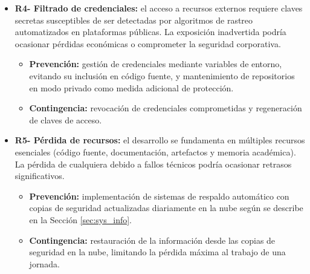 \begin{itemize}
  \item\textbf{R4- Filtrado de credenciales: }el acceso a recursos externos requiere claves secretas susceptibles de ser detectadas por algoritmos de rastreo automatizados en plataformas públicas. La exposición inadvertida podría ocasionar pérdidas económicas o comprometer la seguridad corporativa.
  \begin{itemize}
    \item \textbf{Prevención: }gestión de credenciales mediante variables de entorno, evitando su inclusión en código fuente, y mantenimiento de repositorios en modo privado como medida adicional de protección.
    \item \textbf{Contingencia: }revocación de credenciales comprometidas y regeneración de claves de acceso.
  \end{itemize}
  
  \item\textbf{R5- Pérdida de recursos: }el desarrollo se fundamenta en múltiples recursos esenciales (código fuente, documentación, artefactos y memoria académica). La pérdida de cualquiera debido a fallos técnicos podría ocasionar retrasos significativos.
  \begin{itemize}
    \item \textbf{Prevención: }implementación de sistemas de respaldo automático con copias de seguridad actualizadas diariamente en la nube según se describe en la Sección \ref{sec:sys_info}.
\item \textbf{Contingencia: }restauración de la información desde las copias de seguridad en la nube, limitando la pérdida máxima al trabajo de una jornada.
  \end{itemize}
\end{itemize}

